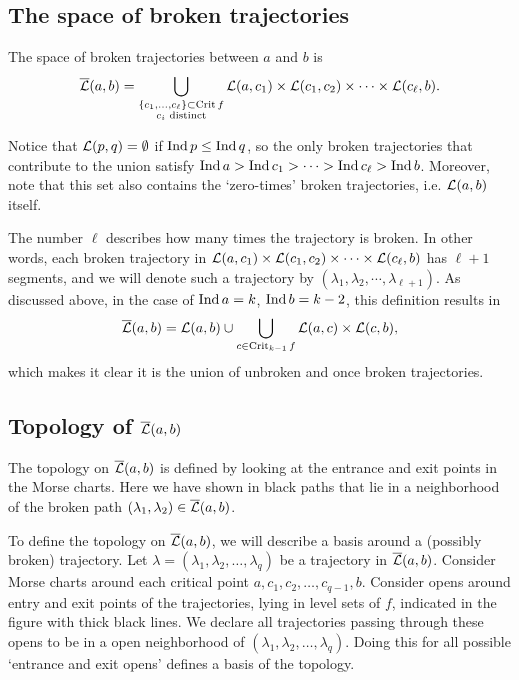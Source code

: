 \subsection{The space of broken trajectories}
\begin{definition}
    The space of broken trajectories between $a$ and  $b$ is
     \[
         \overline{\mathcal L}(a, b) = \bigcup_{\substack{\{c_1, \ldots, c_\ell\} \subset \operatorname{Crit} f\\ c_i \text{ distinct}}} \mathcal L(a, c_1) \times \mathcal L(c_1, c_2) \times  \cdots \times \mathcal L(c_\ell, b)
    .\] 
\end{definition}
\begin{remark}
    Notice that $\mathcal L(p, q) = \emptyset$ if $\operatorname{Ind} p \le \operatorname{Ind} q$, so the only broken trajectories that contribute to the union satisfy $\operatorname{Ind} a > \operatorname{Ind} c_1 > \cdots >\operatorname{Ind} c_\ell > \operatorname{Ind} b$.
    Moreover, note that this set also contains the `zero-times' broken trajectories,  i.e. $\mathcal L(a, b)$ itself.
\end{remark}
    The number $\ell$ describes how many times the trajectory is broken.
    In other words, each broken trajectory in $\mathcal L(a, c_1) \times \mathcal L(c_1, c_2) \times  \cdots \times \mathcal L(c_\ell, b)$ has $ \ell+1$ segments,  and we will denote such a trajectory by $(\lambda_1, \lambda_2, \cdots, \lambda_{\ell+1})$.
    As discussed above, in the case of $\operatorname{Ind} a = k$, $\operatorname{Ind} b = k -2$, this definition results in 
    \[
        \overline{\mathcal L}(a, b) = \mathcal L(a, b) \cup  \bigcup_{c \in \operatorname{Crit}_{k-1} f}  \mathcal L(a, c) \times \mathcal L(c, b)
    ,\] 
    which makes it clear it is the union of unbroken and once broken trajectories.

\subsection{Topology of $\overline{\mathcal L}(a, b)$}


\begin{marginfigure}
    \centering
    \caption{The topology on $\overline{\mathcal L}(a, b) $ is defined by looking at the entrance and exit points in the Morse charts.
        Here we have shown in black paths that lie in a neighborhood of the broken path $(\lambda_1, \lambda_2) \in \overline{\mathcal L}(a, b)$.
    }
    \label{fig:morse-homology-definition-of-topology}
\end{marginfigure}
To define the topology on $\overline{\mathcal L}(a, b)$,
we will describe a basis around a (possibly broken) trajectory.
Let $\lambda = (\lambda_1, \lambda_2, \ldots, \lambda_q)$ be a trajectory in $\overline{\mathcal L}(a, b)$.
Consider Morse charts around each critical point  $a, c_1, c_2, \ldots, c_{q-1}, b$.
Consider opens around entry and exit points of the trajectories, lying in level sets of $f$, indicated in the figure with thick black lines.
We declare all trajectories passing through these opens to be in a open neighborhood of $(\lambda_1, \lambda_2, \ldots, \lambda_q)$.
Doing this for all possible `entrance and exit opens' defines a basis of the topology.

